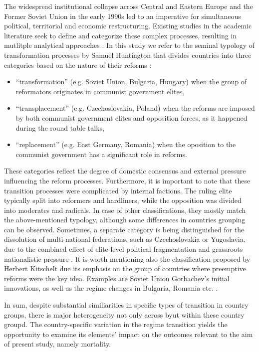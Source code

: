 \documentclass[12pt]{article}
\begin{document}
The widespread institutional collapse across Central and Eastern Europe and the Former Soviet Union in the early 1990s 
led to an imperative for simultaneous political, territorial and economic restructuring. 
Existing studies in the academic literature seek to define and categorize these complex processes, resulting in mutlitple analytical approaches \citep{C_BujwidKurek_Transformacja2015}. In this study we refer to the seminal typology of transformation processes \citep{C_BujwidKurek_Transformacja2015} by Samuel Huntington that divides countries into three categories 
based on the nature of their reforms \citep{D_Huntington1991}:
\begin{itemize}
    \item ``transformation'' (e.g. Soviet Union, Bulgaria, Hungary) when the group of reformators originates in communist government elites, 
    \item ``transplacement'' (e.g. Czechoslovakia, Poland) when the reforms are imposed by both communist government elites and opposition forces, as it happened during the round table talks,
    \item ``replacement'' (e.g. East Germany, Romania) when the oposition to the communist government has a significant role in reforms.
\end{itemize}
These categories reflect the degree of domestic consensus and external pressure influencing the reform processes. 
Furthermore, it is important to note that these transition processes were complicated by internal factions. The ruling elite typically split into reformers and hardliners, 
while the opposition was divided into moderates and radicals. In case of other classifications, they mostly match the above-mentioned typology, although
some differences in countries grouping can be observed. Sometimes, a separate category is being distinguished for the dissolution of multi-national federations, such as 
Czechoslovakia or Yugoslavia, due to the combined effect of elite-level political fragmentation and grassroots nationalistic pressure \citep{Wiatr2020, Bunce1999}.
It is worth mentioning also the classification proposed by Herbert Kitschelt due its emphasis on the group of countries where preemptive reforms were the key idea. Examples are Soviet Union 
Gorbachev’s initial innovations, as well as the regime changes in Bulgaria, Romania etc. \citep{Kitschelt2001}.

In sum, despite substantial similiarities in specific types of transition in country groups, there is major heterogeneity not only across byut within these country groupd. The country-specific variation in the regime transition yields the opportunity to examine its elements' impact on the outcomes relevant to the aim of present study, namely mortality.
\end{document}
